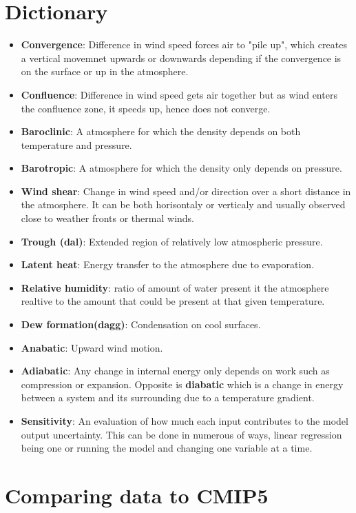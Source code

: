 \documentclass{article}
\begin{document}
	\section{Dictionary}
	\begin{itemize}
		\item \textbf{Convergence}: Difference in wind speed forces air to "pile up", which creates a vertical movemnet upwards or downwards depending if the convergence is on the surface or up in the atmosphere.
		\item \textbf{Confluence}: Difference in wind speed gets air together but as wind enters the confluence zone, it speeds up, hence does not converge.
		\item \textbf{Baroclinic}: A atmosphere for which the density depends on both temperature and pressure.
		\item \textbf{Barotropic}: A atmosphere for which the density only depends on pressure.
		\item \textbf{Wind shear}: Change in wind speed and/or direction over a short distance in the atmosphere. It can be both horisontaly or verticaly and usually observed close to weather fronts or thermal winds.
		\item \textbf{Trough (dal)}: Extended region of relatively low atmospheric pressure.
		\item \textbf{Latent heat}: Energy transfer to the atmosphere due to evaporation.
		\item \textbf{Relative humidity}: ratio of amount of water present it the atmosphere realtive to the amount that could be present at that given temperature.
		\item \textbf{Dew formation(dagg)}: Condensation on cool surfaces.
		\item \textbf{Anabatic}: Upward wind motion.
		\item \textbf{Adiabatic}: Any change in internal energy only depends on work such as compression or expansion. Opposite is \textbf{diabatic} which is a change in energy between a system and its surrounding due to a temperature gradient.
		\item \textbf{Sensitivity}: An evaluation of how much each input contributes to the model output uncertainty. This can be done in numerous of ways, linear regression being one or running the model and changing one variable at a time.
	\end{itemize}

	\section{Comparing data to CMIP5}
\end{document}
